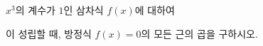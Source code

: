 $x^3$의 계수가 $1$인 삼차식 $f(x)$에 대하여 \par\smallskip{}\par\smallskip\noindent 이 성립할 때, 방정식 $f(x)=0$의 모든 근의 곱을 구하시오.

